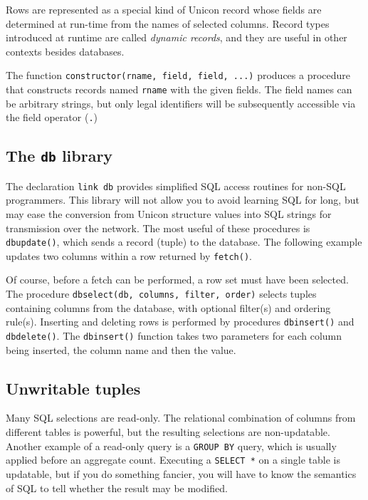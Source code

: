 Rows are represented as a special kind of Unicon record whose
fields are determined at run-time from the names
of selected columns. Record types introduced at runtime
are called \textit{dynamic records}, and they are useful in other
contexts besides databases.

The function \texttt{constructor(rname, field, field, ...)} produces a
procedure that constructs records named
\texttt{rname} with the given fields. The field names
can be arbitrary strings, but only legal identifiers
will be subsequently accessible via the field operator (\texttt{.})

\subsection*{The \texttt{db} library}

The declaration \texttt{link db} provides simplified SQL access routines
for non-SQL programmers.
This library will not allow you to avoid learning SQL for long,
but may ease the conversion from Unicon structure values into SQL
strings for transmission over the network.
The most useful of these procedures is \texttt{dbupdate()}, which sends
a record (tuple) to the database. The following example updates two
columns within a row returned by \texttt{fetch()}.


Of course, before a fetch can be performed, a row set must have been
selected. The procedure \texttt{dbselect(db, columns, filter, order)}
selects tuples containing columns from the database, with optional
filter(s) and ordering rule(s).
Inserting and deleting rows is performed by procedures
\texttt{dbinsert()} and \texttt{dbdelete()}. The \texttt{dbinsert()}
function takes two parameters for each column being inserted, the
column name and then the value.

\subsection*{Unwritable tuples}

Many SQL selections are read-only.  The relational combination of
columns from different tables is powerful, but the resulting
selections are non-updatable.  Another example of a read-only query is
a \texttt{GROUP BY} query, which is usually applied before an
aggregate count. Executing a \texttt{SELECT *} on a single table is
updatable, but if you do something fancier, you will have to know the
semantics of SQL to tell whether the result may be modified.

